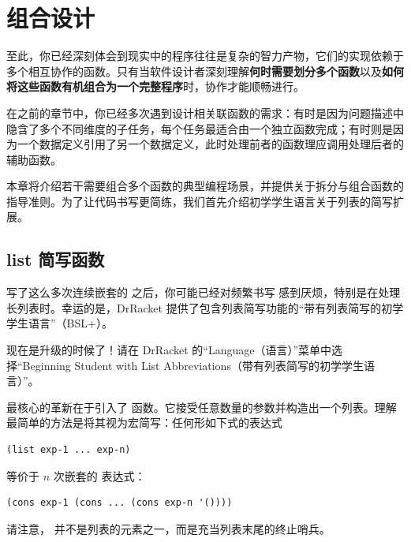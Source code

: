 
\chapter{组合设计}
\label{sec:ch11_design_by_composition}

至此，你已经深刻体会到现实中的程序往往是复杂的智力产物，它们的实现依赖于多个相互协作的函数。只有当软件设计者深刻理解\textbf{何时需要划分多个函数}以及\textbf{如何将这些函数有机组合为一个完整程序}时，协作才能顺畅进行。

在之前的章节中，你已经多次遇到设计相关联函数的需求：有时是因为问题描述中隐含了多个不同维度的子任务，每个任务最适合由一个独立函数完成；有时则是因为一个数据定义引用了另一个数据定义，此时处理前者的函数理应调用处理后者的辅助函数。

本章将介绍若干需要组合多个函数的典型编程场景，并提供关于拆分与组合函数的指导准则。为了让代码书写更简练，我们首先介绍初学学生语言关于列表的简写扩展。

\section{list 简写函数}
\label{sec:ch11_the_list_function}

写了这么多次连续嵌套的  之后，你可能已经对频繁书写  感到厌烦，特别是在处理长列表时。幸运的是，DrRacket 提供了包含列表简写功能的“带有列表简写的初学学生语言”（BSL+）。

\begin{notebox}[切换教学语言]
现在是升级的时候了！请在 DrRacket 的“Language（语言）”菜单中选择“Beginning Student with List Abbreviations（带有列表简写的初学学生语言）”。
\end{notebox}

最核心的革新在于引入了  函数。它接受任意数量的参数并构造出一个列表。理解  最简单的方法是将其视为宏简写：任何形如下式的表达式
\begin{lstlisting}[language=BSL]
(list exp-1 ... exp-n)
\end{lstlisting}
等价于 $n$ 次嵌套的  表达式：
\begin{lstlisting}[language=BSL]
(cons exp-1 (cons ... (cons exp-n '())))
\end{lstlisting}
请注意， 并不是列表的元素之一，而是充当列表末尾的终止哨兵。


